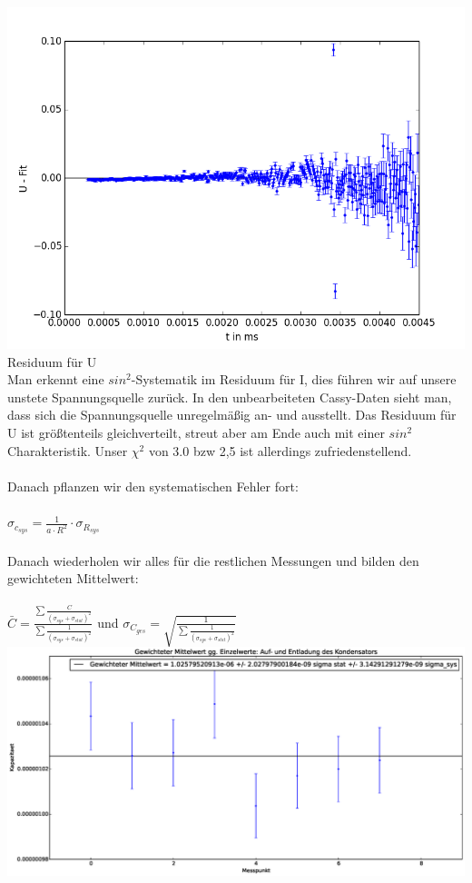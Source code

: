 \documentclass[12pt,a4paper]{article}
\begin{document}
\includegraphics[scale=0.35]{residuum_U}\\
Residuum für U
\\Man erkennt eine $sin^2$-Systematik im Residuum für I, dies führen wir auf unsere unstete Spannungsquelle zurück. In den unbearbeiteten Cassy-Daten sieht man, dass sich die Spannungsquelle unregelmäßig an- und ausstellt. Das Residuum für U ist größtenteils gleichverteilt, streut aber am Ende auch mit einer $sin^2$ Charakteristik. Unser $\chi^2$ von 3.0 bzw 2,5 ist allerdings zufriedenstellend.\\
\\Danach pflanzen wir den systematischen Fehler fort:\\
\\$\sigma_{c_{sys}} = \frac{1}{a\cdot R^2}\cdot\sigma_{R_{sys}}$\\
\\Danach wiederholen wir alles für die restlichen Messungen und bilden den gewichteten Mittelwert:\\
\\$\bar{C} = \frac{\sum{\frac{C}{(\sigma_{sys}+\sigma_{stat})^2}}}{\sum{\frac{1}{(\sigma_{sys}+\sigma_{stat})^2}}}$ und $\sigma_{C_{ges}} = \sqrt{\frac{1}{\sum{\frac{1}{(\sigma_{sys}+\sigma_{stat})^2}}}}$\\
\includegraphics[scale=0.4]{verteilung_mean.eps}\\
\end{document}
